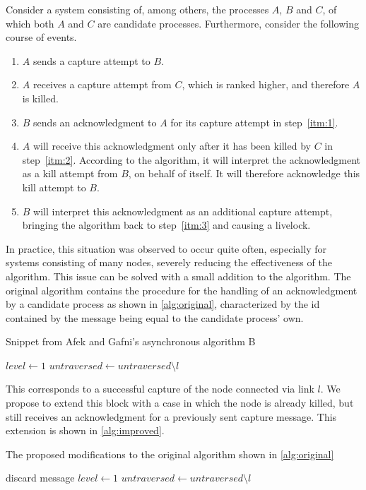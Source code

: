 \documentclass{article}
\begin{document}
Consider a system consisting of, among others, the processes $A$, $B$ and $C$, of which both $A$ and $C$ are candidate processes. Furthermore, consider the following course of events.

\begin{enumerate}
	\item \label{itm:1} $A$ sends a capture attempt to $B$.
	\item \label{itm:2} $A$ receives a capture attempt from $C$, which is ranked higher, and therefore $A$ is killed.
	\item \label{itm:3} $B$ sends an acknowledgment to $A$ for its capture attempt in step~\ref{itm:1}.
	\item $A$ will receive this acknowledgment only after it has been killed by $C$ in step~\ref{itm:2}. According to the algorithm, it will interpret the acknowledgment as a kill attempt from $B$, on behalf of itself. It will therefore acknowledge this kill attempt to $B$.
	\item $B$ will interpret this acknowledgment as an additional capture attempt, bringing the algorithm back to step~\ref{itm:3} and causing a livelock.
\end{enumerate}

In practice, this situation was observed to occur quite often, especially for systems consisting of many nodes, severely reducing the effectiveness of the algorithm. This issue can be solved with a small addition to the algorithm. The original algorithm contains the procedure for the handling of an acknowledgment by a candidate process as shown in \cref{alg:original}, characterized by the id contained by the message being equal to the candidate process' own.

\begin{algorithm}
	\caption{Snippet from Afek and Gafni's asynchronous algorithm B}
	\begin{algorithmic}
			\STATE $level \gets 1$
			\STATE $untraversed \gets untraversed \setminus l$
		\ENDIF
	\end{algorithmic}
	\label{alg:original}
\end{algorithm}

This corresponds to a successful capture of the node connected via link $l$. We propose to extend this block with a case in which the node is already killed, but still receives an acknowledgment for a previously sent capture message. This extension is shown in \cref{alg:improved}.

\begin{algorithm}
	\caption{The proposed modifications to the original algorithm shown in \cref{alg:original}}
	\begin{algorithmic}
		\IF{$id' = id$}
			\IF{$killed$}
				\STATE discard message
			\ELSE
				\STATE $level \gets 1$
				\STATE $untraversed \gets untraversed \setminus l$
			\ENDIF
		\ENDIF{}
	\end{algorithmic}
	\label{alg:improved}
\end{algorithm}
\end{document}
